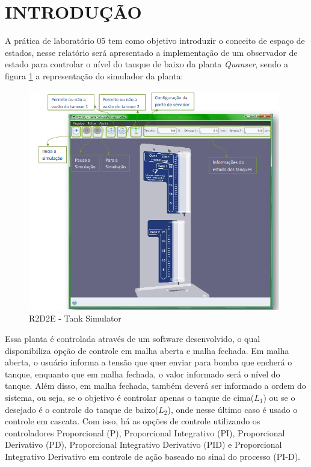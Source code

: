 \documentclass[a4paper,12pt]{article}
\begin{document}

\thispagestyle{main}

\section{INTRODUÇÃO}

\hspace{4ex}A prática de laboratório 05 tem como objetivo introduzir o conceito de espaço de estados, nesse relatório será apresentado a implementação de um observador de estado para controlar o nível do tanque de baixo da planta \textit{Quanser}, sendo a figura \ref{r2d2e} a representação do simulador da planta:

\begin{figure}[H]
\centering
\includegraphics[width=11cm]{ImagensLab4/simulator.png}
\caption{R2D2E - Tank Simulator}
\label{r2d2e}
\end{figure}

\hspace{4ex}Essa planta é controlada através de um software desenvolvido, o qual disponibiliza opção de controle em malha aberta e malha fechada. Em malha aberta, o usuário informa a tensão que quer enviar para bomba que encherá o tanque, enquanto que em malha fechada, o valor informado será o nível do tanque. Além disso, em malha fechada, também deverá ser informado a ordem do sistema, ou seja, se o objetivo é controlar apenas o tanque de cima($L_1$) ou se o desejado é o controle do tanque de baixo($L_2$), onde nesse último caso é usado o controle em cascata. Com isso, há as opções de controle utilizando os controladores Proporcional (P), Proporcional Integrativo (PI), Proporcional Derivativo (PD), Proporcional Integrativo Derivativo (PID) e Proporcional Integrativo Derivativo em controle de ação baseado no sinal do processo (PI-D).
\end{document}
